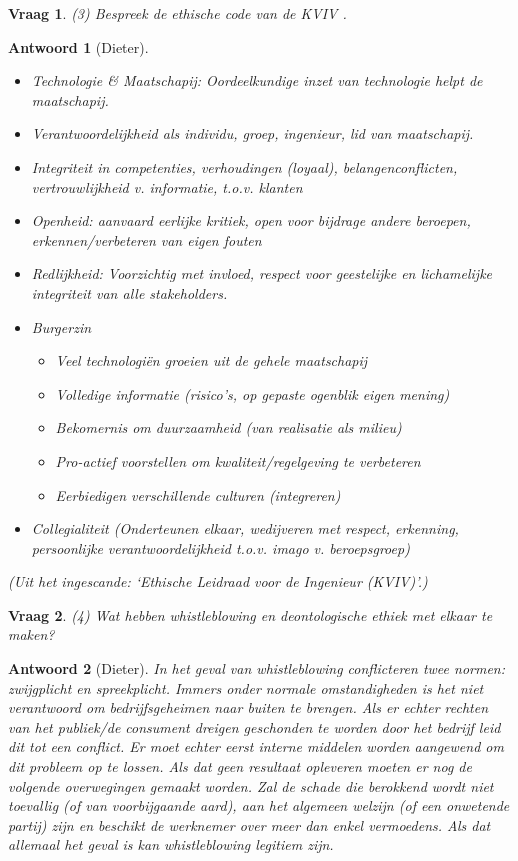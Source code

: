 \documentclass{article}
\theoremstyle{nonumberplain}
\newtheorem{question}{Vraag}
\newtheorem{answer}{Antwoord}
\begin{document}
\begin{question}
(3)	Bespreek de ethische code van de KVIV .
\end{question}
\begin{answer}[Dieter]
	\begin{itemize}
		\item Technologie \& Maatschapij: Oordeelkundige inzet van technologie helpt de maatschapij.
		\item Verantwoordelijkheid als individu, groep, ingenieur, lid van maatschapij. 
		\item Integriteit in competenties, verhoudingen (loyaal), belangenconflicten, vertrouwlijkheid v. informatie, t.o.v. klanten
		\item Openheid: aanvaard eerlijke kritiek, open voor bijdrage andere beroepen, erkennen/verbeteren van eigen fouten
		\item Redlijkheid: Voorzichtig met invloed, respect voor geestelijke en lichamelijke integriteit van alle stakeholders.
		\item Burgerzin 
			\begin{itemize}
				\item Veel technologi\"en groeien uit de gehele maatschapij
				\item Volledige informatie (risico's, op gepaste ogenblik eigen mening)
				\item Bekomernis om duurzaamheid (van realisatie als milieu)
				\item Pro-actief voorstellen om kwaliteit/regelgeving te verbeteren
				\item Eerbiedigen verschillende culturen (integreren)
			\end{itemize} 
		\item Collegialiteit (Onderteunen elkaar, wedijveren met respect, erkenning, persoonlijke verantwoordelijkheid t.o.v. imago v. beroepsgroep)
	\end{itemize}

	\textit{(Uit het ingescande: `Ethische Leidraad voor de Ingenieur (KVIV)'.)}
\end{answer}

\begin{question}
(4)	Wat hebben whistleblowing en deontologische ethiek met elkaar te maken?
\end{question}
\begin{answer}[Dieter]
	In het geval van whistleblowing conflicteren twee normen: zwijgplicht en spreekplicht.
	Immers onder normale omstandigheden is het niet verantwoord om bedrijfsgeheimen naar buiten te brengen.
	Als er echter rechten van het publiek/de consument dreigen geschonden te worden door het bedrijf leid dit tot een conflict.
	Er moet echter eerst interne middelen worden aangewend om dit probleem op te lossen. Als dat geen resultaat opleveren moeten er nog de volgende overwegingen gemaakt worden. Zal de schade die berokkend wordt niet toevallig (of van voorbijgaande aard), aan het algemeen welzijn (of een onwetende partij) zijn en beschikt de werknemer over meer dan enkel vermoedens. Als dat allemaal het geval is kan whistleblowing legitiem zijn.
\end{answer}
\end{document}
